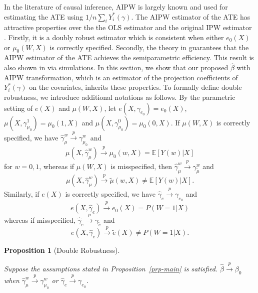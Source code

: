 \documentclass[
  12pt,
  12pt]{article}
\numberwithin{equation}{section}
\theoremstyle{definition}
\theoremstyle{plain}
\newtheorem{proposition}{Proposition}[section]
\theoremstyle{plain}
\theoremstyle{remark}
\begin{document}
In the literature of causal inference, AIPW is largely known and used
for estimating the ATE using \(1/n\sum_i Y_i^*(\gamma)\). The AIPW
estimator of the ATE has attractive properties over the the OLS
estimator and the original IPW estimator
\citep[e.g.][]{scharfstein1999adjusting, lunceford2004stratification}.
Firstly, it is a doubly robust estimator which is consistent when either
\(e_0(X)\) or \(\mu_0(W, X)\) is correctly specified. Secondly, the
theory in \citet{robins1994estimation} guarantees that the AIPW
estimator of the ATE achieves the semiparametric efficiency. This result
is also shown in \citet{lunceford2004stratification} via simulations. In
this section, we show that our proposed \(\hat\beta\) with AIPW
transformation, which is an estimator of the projection coefficients of
\(Y_i^*(\gamma)\) on the covariates, inherits these properties. To
formally define double robustness, we introduce additional notations as
follows. By the parametric setting of \(e(X)\) and \(\mu(W, X)\), let
\(e(X, \gamma_{e_0}) = e_0(X)\),
\(\mu(X, \gamma^1_{\mu_0}) = \mu_0(1, X)\) and
\(\mu(X, \gamma^0_{\mu_0}) = \mu_0(0, X)\). If \(\mu(W, X)\) is
correctly specified, we have
\(\hat\gamma^w_\mu \xrightarrow{p} \gamma^w_{\mu_0}\) and \[
\mu(X, \hat\gamma^w_\mu) \xrightarrow{p} \mu_0(w, X) = \mathbb{E}[Y(w)|X]
\] for \(w = 0, 1\), whereas if \(\mu(W, X)\) is misspecified, then
\(\hat\gamma^w_\mu \xrightarrow{p} \gamma^w_{\tilde\mu}\) and \[
\mu(X, \hat\gamma^w_\mu) \xrightarrow{p} \tilde\mu(w, X) \neq \mathbb{E}[Y(w)|X].
\] Similarly, if \(e(X)\) is correctly specified, we have
\(\hat\gamma_e \xrightarrow{p} \gamma_{e_0}\) and \[
e(X, \hat\gamma_e) \xrightarrow{p} e_0(X) = P(W = 1|X)
\] whereas if misspecified,
\(\hat\gamma_e \xrightarrow{p} \gamma_{\tilde{e}}\) and \[
e(X, \hat\gamma_e) \xrightarrow{p} \tilde{e}(X) \neq P(W = 1|X).
\]

\begin{proposition}[Double
Robustness]\protect\hypertarget{prp-doublerobust}{}\label{prp-doublerobust}

Suppose the assumptions stated in Proposition~\ref{prp-main} is
satisfied. \(\hat\beta \xrightarrow{p} \beta_0\) when
\(\hat\gamma^w_\mu \xrightarrow{p} \gamma^w_{\mu_0}\) or
\(\hat\gamma_e \xrightarrow{p} \gamma_{e_0}\).

\end{proposition}
\end{document}

